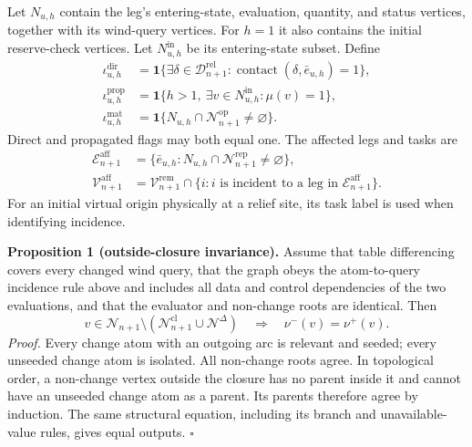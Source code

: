 Let $N_{u,h}$ contain the leg's entering-state, evaluation, quantity, and
status vertices, together with its wind-query vertices.
For $h=1$ it also contains the initial reserve-check vertices.
Let $N_{u,h}^{\mathrm{in}}$ be its entering-state subset. Define
\begin{align}
\iota_{u,h}^{\mathrm{dir}}
&=\mathbf 1\{\exists\delta\in\mathcal D_{n+1}^{\mathrm{rel}}:
\operatorname{contact}(\delta,\bar e_{u,h})=1\},
\label{eq:direct_flag}\\
\iota_{u,h}^{\mathrm{prop}}
&=\mathbf 1\{h>1,\ \exists v\in N_{u,h}^{\mathrm{in}}:\mu(v)=1\},
\label{eq:propagated_flag}\\
\iota_{u,h}^{\mathrm{mat}}
&=\mathbf 1\{N_{u,h}\cap\mathcal N_{n+1}^{\mathrm{op}}\ne\varnothing\}.
\label{eq:material_flag}
\end{align}
Direct and propagated flags may both equal one. The affected legs and tasks
are
\begin{align}
\mathcal E_{n+1}^{\mathrm{aff}}
&=\{\bar e_{u,h}:N_{u,h}\cap\mathcal N_{n+1}^{\mathrm{rep}}
\ne\varnothing\},
\label{eq:affected_legs}\\
\mathcal V_{n+1}^{\mathrm{aff}}
&=\mathcal V_{n+1}^{\mathrm{rem}}\cap
\{i:i\text{ is incident to a leg in }\mathcal E_{n+1}^{\mathrm{aff}}\}.
\label{eq:affected_tasks}
\end{align}
For an initial virtual origin physically at a relief site, its task label
is used when identifying incidence.

\medskip
\noindent\textbf{Proposition 1 (outside-closure invariance).}
Assume that table differencing covers every changed wind query,
that the graph obeys the atom-to-query incidence rule above and includes
all data and control dependencies of the two evaluations, and that the
evaluator and non-change roots are identical.
Then
\begin{equation}
v\in\mathcal N_{n+1}\setminus
(\mathcal N_{n+1}^{\mathrm{cl}}\cup\mathcal N^\Delta)
\quad\Longrightarrow\quad \nu^-(v)=\nu^+(v).
\label{eq:outside_closure_invariance}
\end{equation}
\emph{Proof.}
Every change atom with an outgoing arc is relevant and seeded; every
unseeded change atom is isolated. All non-change roots agree.
In topological order, a non-change vertex outside the closure has no parent
inside it and cannot have an unseeded change atom as a parent. Its parents
therefore agree by induction. The same structural equation, including its
branch and unavailable-value rules, gives equal outputs.
\hfill$\square$

